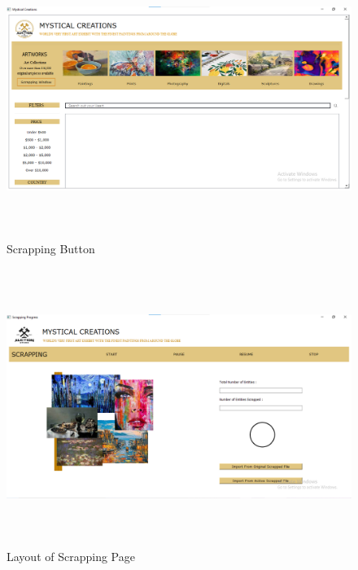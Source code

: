 \documentclass[12pt]{article}
\begin{document}
    \newpage
    \begin{figure}[ht!]
	    \includegraphics[width = 16cm, height = 9cm]{Scrapping Button.png}
	    \renewcommand{\thefigure}{3.13}
	    \caption{Scrapping Button}
    \end{figure}
    \begin{figure}[ht!]
	    \includegraphics[width = 16cm, height = 9cm]{Scrapping Page.png}
	    \renewcommand{\thefigure}{3.14}
	    \caption{Layout of Scrapping Page}
    \end{figure}
    
    \newpage
\end{document}
